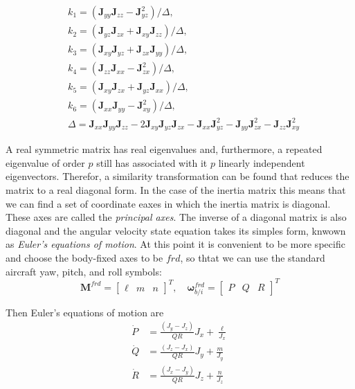     \begin{align*}
        &k_{1} = \left(\mathbf{J}_{yy} \mathbf{J}_{zz} - \mathbf{J}_{yz}^{2} \right) / \Delta, \\
        &k_{2} = \left(\mathbf{J}_{yz} \mathbf{J}_{zx} + \mathbf{J}_{xy} \mathbf{J}_{zz} \right) / \Delta, \\
        &k_{3} = \left(\mathbf{J}_{xy} \mathbf{J}_{yz} + \mathbf{J}_{zx} \mathbf{J}_{yy} \right) / \Delta, \\
        &k_{4} = \left(\mathbf{J}_{zz} \mathbf{J}_{xx} - \mathbf{J}_{zx}^{2} \right) / \Delta, \\
        &k_{5} = \left(\mathbf{J}_{xy} \mathbf{J}_{zx} + \mathbf{J}_{yz} \mathbf{J}_{xx} \right) / \Delta, \\
        &k_{6} = \left(\mathbf{J}_{xx} \mathbf{J}_{yy} - \mathbf{J}_{xy}^{2} \right) / \Delta, \\
        &\Delta = \mathbf{J}_{xx} \mathbf{J}_{yy} \mathbf{J}_{zz} - 2 \mathbf{J}_{xy} \mathbf{J}_{yz} \mathbf{J}_{zx} - \mathbf{J}_{xx}\mathbf{J}_{yz}^{2} - \mathbf{J}_{yy}\mathbf{J}_{zx}^{2} - \mathbf{J}_{zz}\mathbf{J}_{xy}^{2}
    \end{align*}

    A real symmetric matrix has real eigenvalues and, furthermore, a repeated eigenvalue of order \(p\) still has associated with it \(p\) linearly independent eigenvectors. Therefor, a similarity transformation can be found that reduces the matrix to a real diagonal form. In the case of the inertia matrix this means that we can find a set of coordinate eaxes in which the inertia matrix is diagonal. These axes are called the \emph{principal axes}. The inverse of a diagonal matrix is also diagonal and the angular velocity state equation takes its simples form, knwown as \emph{Euler's equations of motion}.
    At this point it is convenient to be more specific and choose the body-fixed axes to be \(frd\), so thtat we can use the standard aircraft yaw, pitch, and roll symbols:
    \begin{equation}\tag{1.7-7}
        \mathbf{M}^{frd} = {\begin{bmatrix} \ell & m & n \end{bmatrix}}^{T}, \quad
        \mathbf{\omega}^{frd}_{b/i}= {\begin{bmatrix} P & Q & R \end{bmatrix}}^{T}
    \end{equation}

    Then Euler's equations of motion are
    \begin{align*}
        \dot{P} &= \frac{\left( J_{y} - J_{z} \right)}{ Q R}{ J_{x} } + \frac{ \ell }{ J_x } \\
        \dot{Q} &= \frac{\left( J_{z} - J_{x} \right)}{ Q R}{ J_{y} } + \frac{ m    }{ J_y } \\
        \dot{R} &= \frac{\left( J_{x} - J_{y} \right)}{ Q R}{ J_{z} } + \frac{ n    }{ J_z }\tag{1.7-8}
    \end{align*}


